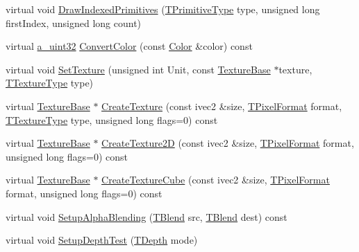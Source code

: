 \begin{DoxyCompactItemize}
\item 
virtual void \hyperlink{class_agmd_1_1_g_l_driver_a4f94f8cf789c88859eb4a678382d70ad}{Draw\+Indexed\+Primitives} (\hyperlink{namespace_agmd_a0e38d0c34891ddd6eef72e1c9e55161c}{T\+Primitive\+Type} type, unsigned long first\+Index, unsigned long count)
\item 
virtual \hyperlink{_common_defines_8h_a964296f9770051b9e4807b1f180dd416}{a\+\_\+uint32} \hyperlink{class_agmd_1_1_g_l_driver_a8831b91a267cb813eea70e53eb4958ea}{Convert\+Color} (const \hyperlink{class_agmd_utilities_1_1_color}{Color} \&color) const 
\item 
virtual void \hyperlink{class_agmd_1_1_g_l_driver_a0434677977067223edacb20476df942c}{Set\+Texture} (unsigned int Unit, const \hyperlink{class_agmd_1_1_texture_base}{Texture\+Base} $\ast$texture, \hyperlink{namespace_agmd_a7036bece09449a930cfec410f75e85f4}{T\+Texture\+Type} type)
\item 
virtual \hyperlink{class_agmd_1_1_texture_base}{Texture\+Base} $\ast$ \hyperlink{class_agmd_1_1_g_l_driver_a41af189f0e80548bb84b7b9796c12c5f}{Create\+Texture} (const ivec2 \&size, \hyperlink{namespace_agmd_afc48fd9fa5dccb4c5621c052bfd1a7ec}{T\+Pixel\+Format} format, \hyperlink{namespace_agmd_a7036bece09449a930cfec410f75e85f4}{T\+Texture\+Type} type, unsigned long flags=0) const 
\item 
virtual \hyperlink{class_agmd_1_1_texture_base}{Texture\+Base} $\ast$ \hyperlink{class_agmd_1_1_g_l_driver_a3cda774b7cc45aab379127e3ed26e291}{Create\+Texture2\+D} (const ivec2 \&size, \hyperlink{namespace_agmd_afc48fd9fa5dccb4c5621c052bfd1a7ec}{T\+Pixel\+Format} format, unsigned long flags=0) const 
\item 
virtual \hyperlink{class_agmd_1_1_texture_base}{Texture\+Base} $\ast$ \hyperlink{class_agmd_1_1_g_l_driver_aababdfe93bce46a06ac61d78d9afc1c4}{Create\+Texture\+Cube} (const ivec2 \&size, \hyperlink{namespace_agmd_afc48fd9fa5dccb4c5621c052bfd1a7ec}{T\+Pixel\+Format} format, unsigned long flags=0) const 
\item 
virtual void \hyperlink{class_agmd_1_1_g_l_driver_adb9e2cc3d36e5cbdc83d4860cdb569be}{Setup\+Alpha\+Blending} (\hyperlink{namespace_agmd_a5c64d61de9c502c3159b9ce5d653f947}{T\+Blend} src, \hyperlink{namespace_agmd_a5c64d61de9c502c3159b9ce5d653f947}{T\+Blend} dest) const 
\item 
virtual void \hyperlink{class_agmd_1_1_g_l_driver_a80794e6e56cda3f0a4ad31d2deac9e0d}{Setup\+Depth\+Test} (\hyperlink{namespace_agmd_a6bf1c529fabec2b3b33d9d94a032cc6a}{T\+Depth} mode)
\item 

\end{DoxyCompactItemize}
